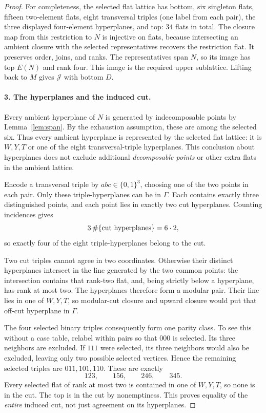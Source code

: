 \documentclass[11pt]{article}
\newcommand{\JJ}{\mathcal J}
\begin{document}
\begin{proof}
For completeness, the selected flat lattice has bottom, six singleton flats, fifteen two-element flats, eight transversal triples (one label from each pair), the three displayed four-element hyperplanes, and top: $34$ flats in total. The closure map from this restriction to $N$ is injective on flats, because intersecting an ambient closure with the selected representatives recovers the restriction flat. It preserves order, joins, and ranks. The representatives span $N$, so its image has top $E(N)$ and rank four. This image is the required upper sublattice. Lifting back to $M$ gives $\JJ$ with bottom $D$.

\paragraph{3. The hyperplanes and the induced cut.}
Every ambient hyperplane of $N$ is generated by indecomposable points by Lemma~\ref{lem:span}. By the exhaustion assumption, these are among the selected six. Thus every ambient hyperplane is represented by the selected flat lattice: it is $W,Y,T$ or one of the eight transversal-triple hyperplanes. This conclusion about hyperplanes does not exclude additional \emph{decomposable points} or other extra flats in the ambient lattice.

Encode a transversal triple by $abc\in\{0,1\}^3$, choosing one of the two points in each pair. Only these triple-hyperplanes can be in $\Gamma$. Each contains exactly three distinguished points, and each point lies in exactly two cut hyperplanes. Counting incidences gives
\[
 3\,\#\{\hbox{cut hyperplanes}\}=6\cdot2,
\]
so exactly four of the eight triple-hyperplanes belong to the cut.

Two cut triples cannot agree in two coordinates. Otherwise their distinct hyperplanes intersect in the line generated by the two common points: the intersection contains that rank-two flat, and, being strictly below a hyperplane, has rank at most two. The hyperplanes therefore form a modular pair. Their line lies in one of $W,Y,T$, so modular-cut closure and upward closure would put that off-cut hyperplane in $\Gamma$.

The four selected binary triples consequently form one parity class. To see this without a case table, relabel within pairs so that $000$ is selected. Its three neighbors are excluded. If $111$ were selected, its three neighbors would also be excluded, leaving only two possible selected vertices. Hence the remaining selected triples are $011,101,110$. These are exactly
\[
 123,\qquad156,\qquad246,\qquad345.
\]
Every selected flat of rank at most two is contained in one of $W,Y,T$, so none is in the cut. The top is in the cut by nonemptiness. This proves equality of the \emph{entire} induced cut, not just agreement on its hyperplanes.


\end{proof}
\end{document}
